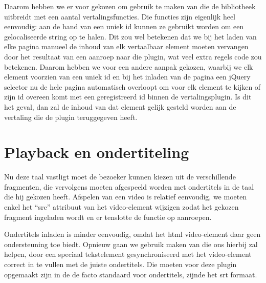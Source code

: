 Daarom hebben we er voor gekozen om gebruik te maken van  die de bibliotheek uitbreidt met een aantal vertalingsfuncties. Die functies zijn eigenlijk heel eenvoudig: aan de hand van een uniek id kunnen ze gebruikt worden om een gelocaliseerde string op te halen. Dit zou wel betekenen dat we bij het laden van elke pagina manueel de inhoud van elk vertaalbaar element moeten vervangen door het resultaat van een aanroep naar die plugin, wat veel extra regels code zou betekenen. Daarom hebben we voor een andere aanpak gekozen, waarbij we elk element voorzien van een uniek id en bij het inladen van de pagina een jQuery selector nu de hele pagina automatisch overloopt om voor elk element te kijken of zijn id overeen komt met een geregistreerd id binnen de vertalingsplugin. Is dit het geval, dan zal de inhoud van dat element gelijk gesteld worden aan de vertaling die de plugin teruggegeven heeft.

\section{Playback en ondertiteling}
\label{voorstellingen:metavoorstelling:playback}

Nu deze taal vastligt moet de bezoeker kunnen kiezen uit de verschillende fragmenten, die vervolgens moeten afgespeeld worden met ondertitels in de taal die hij gekozen heeft. Afspelen van een video is relatief eenvoudig, we moeten enkel het ``src'' attribuut van het video-element wijzigen zodat het gekozen fragment ingeladen wordt en er tenslotte de  functie op aanroepen.

Ondertitels inladen is minder eenvoudig, omdat het \ac{html} video-element daar geen ondersteuning toe biedt. Opnieuw gaan we gebruik maken van  die ons hierbij zal helpen, door een speciaal tekstelement gesynchroniseerd met het video-element correct in te vullen met de juiste ondertitels. Die moeten voor deze plugin opgemaakt zijn in de de facto standaard voor ondertitels, zijnde het \ac{srt} formaat.

